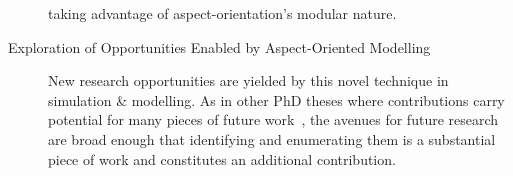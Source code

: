 \begin{description}
    taking advantage of aspect-orientation's modular nature.
  \item[Exploration of Opportunities Enabled by Aspect-Oriented Modelling]
    New research opportunities are yielded by this novel technique in simulation
    \& modelling. As in other PhD theses where contributions carry potential for
    many pieces of future work~\cite{marsh1994formalising}, the avenues for
    future research are broad enough that identifying and enumerating them is a
    substantial piece of work and constitutes an additional contribution.
\end{description}









